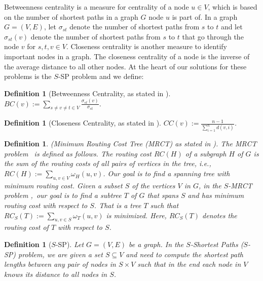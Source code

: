 \documentclass[11pt]{article}
\newtheorem{definition}[theorem]{Definition}
\begin{document}
Betweenness centrality is a measure for centrality of a node $u\in V$, which is based on the number of shortest paths in a graph $G$ node $u$ is part of. In a graph $G=(V,E)$, let $\sigma_{st}$ denote the number of shortest paths from $s$ to $t$ and let $\sigma_{st}(v)$ denote the number of shortest paths from $s$ to $t$ that go through the node $v$ for $s,t,v\in V$. Closeness centrality is another measure to identify important nodes in a graph. The closeness centrality of a node is the inverse of the average distance to all other nodes. At the heart of our solutions for these problems is the $S$-SP problem and we define:

\begin{definition}[Betweenness Centrality, as stated in \cite{freeman1977}] $BC(v):=\sum\limits_{s\neq v\neq t \in V}\frac{\sigma_{st}(v)}{\sigma_{st}}$.
\end{definition}

\begin{definition}[Closeness Centrality, as stated in \cite{beauchamp1965}] $CC(v):=\frac{n-1}{\sum_{i=1}^nd(v,i)}$.
\end{definition}


\begin{definition}\label{def:MRCT}(Minimum Routing Cost Tree (MRCT) as stated in \cite{WuLBCRT99} ).
The MRCT problem~\cite{WuLBCRT99} is defined as follows. The routing cost $RC\left(H\right)$ of a subgraph $H$ of $G$ is the sum of the routing costs of all pairs of vertices in the tree, i.e., $RC\left(H\right):=\sum_{u, v\in V} \omega_H\left(u, v\right)$. Our goal is to find a spanning tree with minimum routing cost.
Given a subset $S$ of the vertices $V$ in $G$, in the $S$-MRCT problem  \cite{hochuli:holzer:MRCST},\ our goal is to find a subtree $T$ of $G$ that spans $S$ and has minimum routing cost with respect to $S$. That is a tree $T$ such that $RC_S\left(T\right):=\sum_{u, v\in S} \omega_T\left(u, v\right)$ is minimized. Here, $RC_S\left(T\right)$ denotes the routing cost of $T$ with respect to $S$.
\end{definition}

\begin{definition}[$S$-SP]
 Let $G = (V, E)$ be a graph. In the $S$-Shortest Paths ($S$-SP) problem, we are
given a set $S\subseteq V$ and need to compute the shortest path lengths between any pair of nodes in $S\times V$ such that in the end each node in $ V$ knows its distance to all nodes in $S$.
\end{definition}
\end{document}
